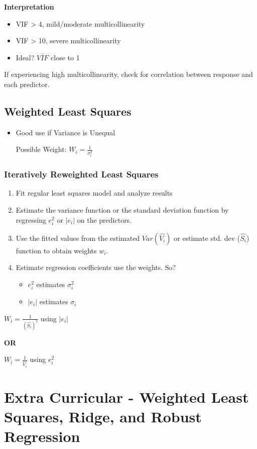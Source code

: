 \documentclass[11pt]{article}
\begin{document}
\textbf{Interpretation}
\begin{itemize}
\item VIF > 4, mild/moderate multicollinearity
\item VIF > 10, severe multicollinearity
\item Ideal? \(\bar{VIF}\) close to 1
\end{itemize}

If experiencing high multicollinearity, check for correlation between response
and each predictor.

\subsection{Weighted Least Squares}
\label{sec:org98efef7}
\begin{itemize}
\item Good use if Variance is Unequal

Possible Weight: \(W_i = \frac{1}{\sigma_i^2}\)
\end{itemize}

\subsubsection{Iteratively Reweighted Least Squares}
\label{sec:orgbbdfedb}
\begin{enumerate}
\item Fit regular least squares model and analyze results
\item Estimate the variance function or the standard deviation function by
regressing \(e_i^2\) or \(|e_i|\) on the predictors.
\item Use the fitted values from the estimated \(Var(\hat{V_i})\) or estimate std.
dev (\(\hat{S_i}\)) function to obtain weights \(w_i\).
\item Estimate regression coefficients use the weights. So?
\begin{itemize}
\item \(e_i^2\) estimates \(\sigma_i^2\)
\item \(|e_i|\) estimates \(\sigma_i\)
\end{itemize}
\end{enumerate}

\(W_i = \frac{1}{(\hat{S_i})^2}\) using \(|e_i|\)

\textbf{OR}

\(W_i = \frac{1}{\hat{V_i}}\) using \(e_i^2\)
\section{Extra Curricular - Weighted Least Squares, Ridge, and Robust Regression}
\label{sec:orgf1e327c}
\end{document}
